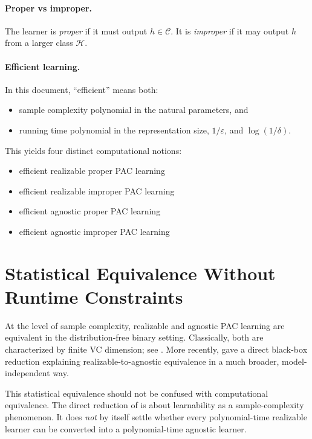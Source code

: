 \paragraph{Proper vs improper.}
The learner is \emph{proper} if it must output $h \in \mathcal{C}$. It is \emph{improper} if it may output $h$ from a larger class $\mathcal{H}$.

\paragraph{Efficient learning.}
In this document, ``efficient'' means both:
\begin{itemize}
\item sample complexity polynomial in the natural parameters, and
\item running time polynomial in the representation size, $1/\varepsilon$, and $\log(1/\delta)$.
\end{itemize}

This yields four distinct computational notions:

\begin{itemize}
\item efficient realizable proper PAC learning
\item efficient realizable improper PAC learning
\item efficient agnostic proper PAC learning
\item efficient agnostic improper PAC learning
\end{itemize}

\section{Statistical Equivalence Without Runtime Constraints}

At the level of sample complexity, realizable and agnostic PAC learning are equivalent in the distribution-free binary setting. Classically, both are characterized by finite VC dimension; see \citet{blumer1989}. More recently, \citet{hopkins2024} gave a direct black-box reduction explaining realizable-to-agnostic equivalence in a much broader, model-independent way.

This statistical equivalence should not be confused with computational equivalence. The direct reduction of \citet{hopkins2024} is about learnability as a sample-complexity phenomenon. It does \emph{not} by itself settle whether every polynomial-time realizable learner can be converted into a polynomial-time agnostic learner.

